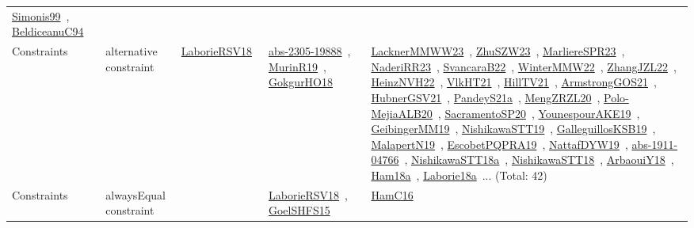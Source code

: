 {\begin{longtable}{lp{3cm}>{\raggedright\arraybackslash}p{6cm}>{\raggedright\arraybackslash}p{6cm}>{\raggedright\arraybackslash}p{8cm}}
\href{../works/Simonis99.pdf}{Simonis99}~\cite{Simonis99}, \href{../works/BeldiceanuC94.pdf}{BeldiceanuC94}~\cite{BeldiceanuC94}\\
Constraints & alternative constraint & \href{../works/LaborieRSV18.pdf}{LaborieRSV18}~\cite{LaborieRSV18} & \href{../works/abs-2305-19888.pdf}{abs-2305-19888}~\cite{abs-2305-19888}, \href{../works/MurinR19.pdf}{MurinR19}~\cite{MurinR19}, \href{../works/GokgurHO18.pdf}{GokgurHO18}~\cite{GokgurHO18} & \href{../works/LacknerMMWW23.pdf}{LacknerMMWW23}~\cite{LacknerMMWW23}, \href{../works/ZhuSZW23.pdf}{ZhuSZW23}~\cite{ZhuSZW23}, \href{../works/MarliereSPR23.pdf}{MarliereSPR23}~\cite{MarliereSPR23}, \href{../works/NaderiRR23.pdf}{NaderiRR23}~\cite{NaderiRR23}, \href{../works/SvancaraB22.pdf}{SvancaraB22}~\cite{SvancaraB22}, \href{../works/WinterMMW22.pdf}{WinterMMW22}~\cite{WinterMMW22}, \href{../works/ZhangJZL22.pdf}{ZhangJZL22}~\cite{ZhangJZL22}, \href{../works/HeinzNVH22.pdf}{HeinzNVH22}~\cite{HeinzNVH22}, \href{../works/VlkHT21.pdf}{VlkHT21}~\cite{VlkHT21}, \href{../works/HillTV21.pdf}{HillTV21}~\cite{HillTV21}, \href{../works/ArmstrongGOS21.pdf}{ArmstrongGOS21}~\cite{ArmstrongGOS21}, \href{../works/HubnerGSV21.pdf}{HubnerGSV21}~\cite{HubnerGSV21}, \href{../works/PandeyS21a.pdf}{PandeyS21a}~\cite{PandeyS21a}, \href{../works/MengZRZL20.pdf}{MengZRZL20}~\cite{MengZRZL20}, \href{../works/Polo-MejiaALB20.pdf}{Polo-MejiaALB20}~\cite{Polo-MejiaALB20}, \href{../works/SacramentoSP20.pdf}{SacramentoSP20}~\cite{SacramentoSP20}, \href{../works/YounespourAKE19.pdf}{YounespourAKE19}~\cite{YounespourAKE19}, \href{../works/GeibingerMM19.pdf}{GeibingerMM19}~\cite{GeibingerMM19}, \href{../works/NishikawaSTT19.pdf}{NishikawaSTT19}~\cite{NishikawaSTT19}, \href{../works/GalleguillosKSB19.pdf}{GalleguillosKSB19}~\cite{GalleguillosKSB19}, \href{../works/MalapertN19.pdf}{MalapertN19}~\cite{MalapertN19}, \href{../works/EscobetPQPRA19.pdf}{EscobetPQPRA19}~\cite{EscobetPQPRA19}, \href{../works/NattafDYW19.pdf}{NattafDYW19}~\cite{NattafDYW19}, \href{../works/abs-1911-04766.pdf}{abs-1911-04766}~\cite{abs-1911-04766}, \href{../works/NishikawaSTT18a.pdf}{NishikawaSTT18a}~\cite{NishikawaSTT18a}, \href{../works/NishikawaSTT18.pdf}{NishikawaSTT18}~\cite{NishikawaSTT18}, \href{../works/ArbaouiY18.pdf}{ArbaouiY18}~\cite{ArbaouiY18}, \href{../works/Ham18a.pdf}{Ham18a}~\cite{Ham18a}, \href{../works/Laborie18a.pdf}{Laborie18a}~\cite{Laborie18a}... (Total: 42)\\
Constraints & alwaysEqual constraint &  & \href{../works/LaborieRSV18.pdf}{LaborieRSV18}~\cite{LaborieRSV18}, \href{../works/GoelSHFS15.pdf}{GoelSHFS15}~\cite{GoelSHFS15} & \href{../works/HamC16.pdf}{HamC16}~\cite{HamC16}\\

\end{longtable}}
